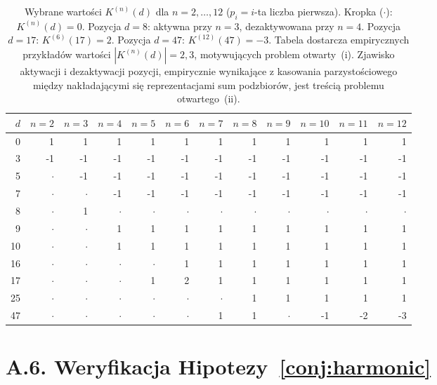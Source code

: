 \begin{table}[H]
\centering
\small
\begin{tabular}{r|rrrrrrrrrrr}
\toprule
$d$ & $n{=}2$ & $n{=}3$ & $n{=}4$ & $n{=}5$ & $n{=}6$ &
      $n{=}7$ & $n{=}8$ & $n{=}9$ & $n{=}10$ & $n{=}11$ & $n{=}12$ \\
\midrule
 0 &  1 &  1 &  1 &  1 &  1 &  1 &  1 &  1 &  1 &  1 &  1 \\
 3 & -1 & -1 & -1 & -1 & -1 & -1 & -1 & -1 & -1 & -1 & -1 \\
 5 &  $\cdot$ & -1 & -1 & -1 & -1 & -1 & -1 & -1 & -1 & -1 & -1 \\
 7 &  $\cdot$ &  $\cdot$ & -1 & -1 & -1 & -1 & -1 & -1 & -1 & -1 & -1 \\
 8 &  $\cdot$ &  1 &  $\cdot$ &  $\cdot$ &  $\cdot$ &  $\cdot$ &  $\cdot$ &  $\cdot$ &  $\cdot$ &  $\cdot$ &  $\cdot$ \\
 9 &  $\cdot$ &  $\cdot$ &  1 &  1 &  1 &  1 &  1 &  1 &  1 &  1 &  1 \\
10 &  $\cdot$ &  $\cdot$ &  1 &  1 &  1 &  1 &  1 &  1 &  1 &  1 &  1 \\
16 &  $\cdot$ &  $\cdot$ &  $\cdot$ &  $\cdot$ &  1 &  1 &  1 &  1 &  1 &  1 &  1 \\
17 &  $\cdot$ &  $\cdot$ &  $\cdot$ &  1 &  2 &  1 &  1 &  1 &  1 &  1 &  1 \\
25 &  $\cdot$ &  $\cdot$ &  $\cdot$ &  $\cdot$ &  $\cdot$ &  $\cdot$ &  1 &  1 &  1 &  1 &  1 \\
47 &  $\cdot$ &  $\cdot$ &  $\cdot$ &  $\cdot$ &  $\cdot$ &  1 &  1 &  $\cdot$ & -1 & -2 & -3 \\
\bottomrule
\end{tabular}
\caption{Wybrane wartości $K^{(n)}(d)$ dla $n = 2, \ldots, 12$
($p_i = i$-ta liczba pierwsza). Kropka ($\cdot$): $K^{(n)}(d) = 0$.
Pozycja $d = 8$: aktywna przy $n=3$, dezaktywowana przy $n=4$.
Pozycja $d = 17$: $K^{(6)}(17) = 2$.
Pozycja $d = 47$: $K^{(12)}(47) = -3$.
Tabela dostarcza empirycznych przykładów wartości
$|K^{(n)}(d)| = 2, 3$, motywujących problem otwarty~(i).
Zjawisko aktywacji i dezaktywacji pozycji,
empirycznie wynikające z kasowania parzystościowego
między nakładającymi się reprezentacjami sum podzbiorów,
jest treścią problemu otwartego~(ii).}
\label{tab:positions}
\end{table}


\section*{A.6. Weryfikacja Hipotezy~\ref{conj:harmonic}}
\label{subsec:a6-hipoteza}

